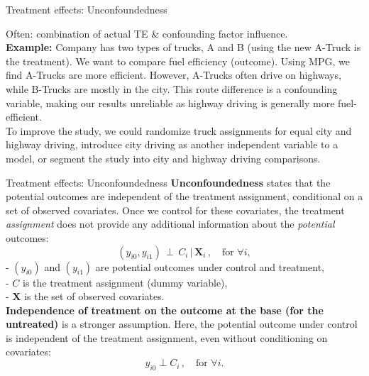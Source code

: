 \documentclass{beamer}
\begin{document}
\begin{frame}{Treatment effects: Unconfoundedness}
\begin{center}
\end{center}
%
\begin{center}
\end{center}
Often: combination of actual TE \& confounding factor influence.\\
\bigskip
\small  
\textbf{Example:} Company has two types of trucks, A and B (using the new A-Truck is the treatment). We want to compare fuel efficiency (outcome). Using MPG, we find A-Trucks are more efficient. However, A-Trucks often drive on highways, while B-Trucks are mostly in the city. This route difference is a confounding variable, making our results unreliable as highway driving is generally more fuel-efficient. \\
\smallskip
To improve the study, we could randomize truck assignments for equal city and highway driving, introduce city driving as another independent variable to a model, or segment the study into city and highway driving comparisons.
\end{frame}
\begin{frame}{Treatment effects: Unconfoundedness}
\textbf{Unconfoundedness} states that the potential outcomes are independent of the treatment assignment, conditional on a set of observed covariates. Once we control for these covariates, the treatment \emph{assignment} does not provide any additional information about the \emph{potential} outcomes:
$$
(y_{i0}, y_{i1}) \, \perp \, C_i \, | \, \bm{X}_i\,, \quad \text{for~} \forall i,
$$
- $(y_{i0})$ and $(y_{i1})$ are potential outcomes under control and treatment,\\
- $C$ is the treatment assignment (dummy variable), \\
- $\bm{X}$ is the set of observed covariates. \\
\bigskip
\textbf{Independence of treatment on the outcome at the base (for the untreated)} is a stronger assumption. Here, the potential outcome under control is independent of the treatment assignment, even without conditioning on covariates:
$$
y_{i0} \perp C_i \,, \quad \text{for~} \forall i.
$$
\end{frame}
\end{document}
